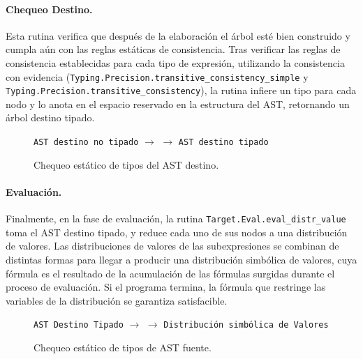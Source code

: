 \paragraph{Chequeo Destino.} Esta rutina verifica que después de la elaboración el árbol esté bien construido y cumpla aún con las reglas estáticas de consistencia. Tras verificar las reglas de consistencia
establecidas para cada tipo de expresión, utilizando la consistencia con evidencia (\verb|Typing.Precision.transitive_consistency_simple| y \verb|Typing.Precision.transitive_consistency|), la rutina infiere un tipo para cada nodo y lo anota en el espacio reservado en la estructura del AST, retornando un árbol destino tipado.


\begin{figure}[h]
\centering
\texttt{AST destino no tipado} $\rightarrow$  $\rightarrow$ \texttt{AST destino tipado}
\label{fig:arch-src-typecheck}
\caption{Chequeo estático de tipos del AST destino.}
\end{figure}


\paragraph{Evaluación.}

Finalmente, en la fase de evaluación, la rutina
\verb|Target.Eval.eval_distr_value| toma el AST destino tipado, y
reduce cada uno de sus nodos a una distribución de valores. Las
distribuciones de valores de las subexpresiones se combinan de
distintas formas para llegar a producir una distribución simbólica de
valores, cuya fórmula es el resultado de la acumulación de las
fórmulas surgidas durante el proceso de evaluación. Si el programa
termina, la fórmula que restringe las variables de la distribución se
garantiza satisfacible.


\begin{figure}[h]
\centering
\texttt{AST Destino Tipado} $\rightarrow$  $\rightarrow$ \texttt{Distribución simbólica de Valores}
\label{fig:arch-src-typecheck}
\caption{Chequeo estático de tipos de AST fuente.}
\end{figure}
